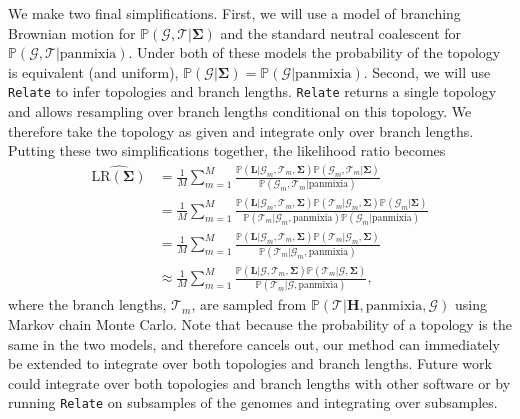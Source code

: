 \documentclass[12pt]{article}
\begin{document}
We make two final simplifications.
First, we will use a model of branching Brownian motion for $\mathbb{P}(\mathcal{G}, \mathcal{T} | \mathbf{\Sigma})$ and the standard neutral coalescent for $\mathbb{P}(\mathcal{G}, \mathcal{T} | \mathrm{panmixia})$.
Under both of these models the probability of the topology is equivalent (and uniform), $\mathbb{P}(\mathcal{G} | \mathbf{\Sigma}) = \mathbb{P}(\mathcal{G} | \mathrm{panmixia})$.
Second, we will use \texttt{Relate} \citep{speidel2019method} to infer topologies and branch lengths.
\texttt{Relate} returns a single topology and allows resampling over branch lengths conditional on this topology.
We therefore take the topology as given and integrate only over branch lengths.
Putting these two simplifications together, the likelihood ratio becomes
%
\begin{equation}\label{eq:LRmontecarlo}
\begin{aligned}
\widehat{\mathrm{LR}(\mathbf{\Sigma})} &= \frac{1}{M} \sum_{m=1}^{M} \frac{ \mathbb{P}(\mathbf{L} | \mathcal{G}_m, \mathcal{T}_m, \mathbf{\Sigma}) \mathbb{P}(\mathcal{G}_m, \mathcal{T}_m | \mathbf{\Sigma})}{\mathbb{P}(\mathcal{G}_m, \mathcal{T}_m | \mathrm{panmixia})}\\
&= \frac{1}{M} \sum_{m=1}^{M} \frac{ \mathbb{P}(\mathbf{L} | \mathcal{G}_m, \mathcal{T}_m, \mathbf{\Sigma}) \mathbb{P}(\mathcal{T}_m | \mathcal{G}_m, \mathbf{\Sigma}) \mathbb{P}(\mathcal{G}_m | \mathbf{\Sigma})}{\mathbb{P}(\mathcal{T}_m | \mathcal{G}_m, \mathrm{panmixia}) \mathbb{P}(\mathcal{G}_m | \mathrm{panmixia})}\\
&= \frac{1}{M} \sum_{m=1}^{M} \frac{ \mathbb{P}(\mathbf{L} | \mathcal{G}_m, \mathcal{T}_m, \mathbf{\Sigma}) \mathbb{P}(\mathcal{T}_m | \mathcal{G}_m, \mathbf{\Sigma})}{\mathbb{P}(\mathcal{T}_m | \mathcal{G}_m, \mathrm{panmixia}) }\\
&\approx \frac{1}{M} \sum_{m=1}^{M} \frac{ \mathbb{P}(\mathbf{L} | \mathcal{G}, \mathcal{T}_m, \mathbf{\Sigma}) \mathbb{P}(\mathcal{T}_m | \mathcal{G}, \mathbf{\Sigma})}{\mathbb{P}(\mathcal{T}_m | \mathcal{G}, \mathrm{panmixia})},
\end{aligned}
\end{equation}
%
where the branch lengths, $\mathcal{T}_m$, are sampled from $\mathbb{P}(\mathcal{T} | \mathbf{H}, \mathrm{panmixia}, \mathcal{G})$ using Markov chain Monte Carlo.
Note that because the probability of a topology is the same in the two models, and therefore cancels out, our method can immediately be extended to integrate over both topologies and branch lengths.
Future work could integrate over both topologies and branch lengths with other software \citep{rasmussen2014genome, wohns2021unified} or by running \texttt{Relate} on subsamples of the genomes and integrating over subsamples. 
\end{document}
